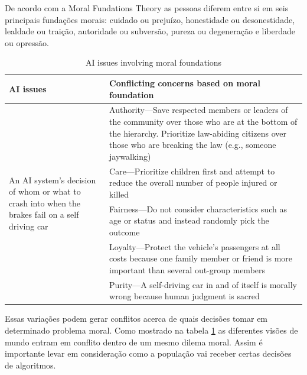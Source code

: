 De acordo com a Moral Fundations Theory \cite{GRAHAM201355} as pessoas diferem entre si em seis principais fundações morais: cuidado ou prejuízo, honestidade ou desonestidade, lealdade ou traição, autoridade ou subversão, pureza ou degeneração e liberdade ou opressão.

\begin{table}
    \centering
    \begin{tabular}{ m{6cm} m{8cm}}
        \hline
        AI issues & Conflicting concerns based on moral foundation \\
        \hline

        \multirow[m]{5}{6cm}{An AI system’s decision of whom or what to crash into when the brakes fail on a self driving car}
        
        & Authority—Save respected members or leaders of the community over those who are at the bottom of the hierarchy. Prioritize law-abiding citizens over those who are breaking the law (e.g., someone jaywalking) \newline \\ 

        & Care—Prioritize children first and attempt to reduce the overall number of people injured or killed \newline\\ 

        & Fairness—Do not consider characteristics such as age or status and instead randomly pick the outcome \newline \\

        & Loyalty—Protect the vehicle’s passengers at all costs because one family member or friend is more important than several out-group members \newline \\

        & Purity—A self-driving car in and of itself is morally wrong because human judgment is sacred \\

        \hline
    \end{tabular}
    \caption{AI issues involving moral foundations \cite{Telkamp2022}}
    \label{table:cars}
\end{table}

Essas variações podem gerar conflitos acerca de quais decisões tomar em determinado problema moral. Como mostrado na tabela \ref{table:cars} as diferentes visões de mundo entram em conflito dentro de um mesmo dilema moral. Assim é importante levar em consideração como a população vai receber certas decisões de algoritmos.


